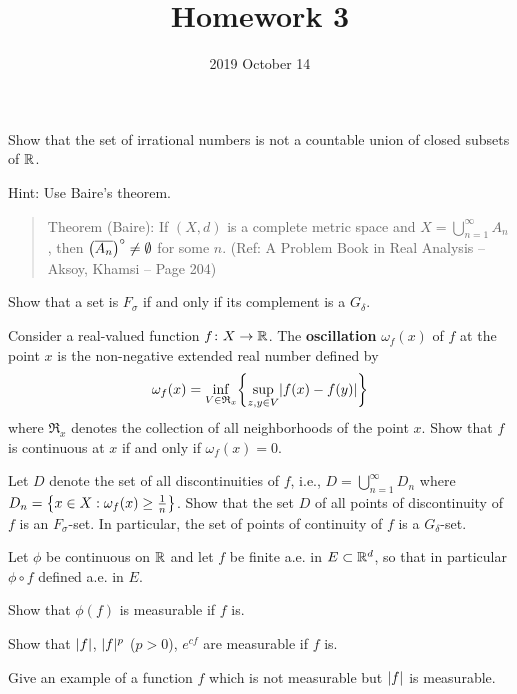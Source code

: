 \documentclass{../homework}
\title{Homework 3}
\author{}
\date{2019 October 14}
\begin{document}
\begin{problems}
\item Show that the set of irrational numbers is not a countable union
  of closed subsets of \(\RR\).

  Hint: Use Baire's theorem.
  \begin{quote}
    Theorem (Baire): If \((X, d)\) is a complete metric space and
    \(X = \bigcup_{n=1}^\infty A_n\), then
    \(\prn*{\overline{A_n}}^\circ \ne \emptyset\) for some \(n\).
    (Ref: A Problem Book in Real Analysis -- Aksoy, Khamsi -- Page
    204)
  \end{quote}

  \begin{solution}
  \end{solution}

\item
  \begin{problems}
  \item Show that a set is \(F_\sigma\) if and only if its complement
    is a \(G_\delta\).
  \item Consider a real-valued function \(f \colon X \to \RR\).  The
    \textbf{oscillation} \(\omega_f(x)\) of \(f\) at the point \(x\)
    is the non-negative extended real number defined by
    \[
      \omega_f(x) = \inf_{V \in \mathfrak R_x}
      \set*{\sup_{z, y \in V} \abs{f(x) - f(y)}}
    \]
    where \(\mathfrak R_x\) denotes the collection of all
    neighborhoods of the point \(x\).  Show that \(f\) is continuous
    at \(x\) if and only if \(\omega_f(x) = 0\).

  \item Let \(D\) denote the set of all discontinuities of \(f\),
    i.e., \(D = \bigcup_{n=1}^\infty D_n\) where
    \(D_n = \set*{x \in X : \omega_f(x) \ge \frac 1 n}\).  Show that
    the set \(D\) of all points of discontinuity of \(f\) is an
    \(F_\sigma\)-set.  In particular, the set of points of continuity
    of \(f\) is a \(G_\delta\)-set.
  \end{problems}

  \begin{solution}
    \begin{problems}
    \item
    \item
    \item
    \end{problems}
  \end{solution}

\item Let \(\phi\) be continuous on \(\RR\) and let \(f\) be finite
  a.e. in \(E \subset \RR^d\), so that in particular \(\phi \circ f\)
  defined a.e. in \(E\).
  \begin{problems}
  \item Show that \(\phi(f)\) is measurable if \(f\) is.
  \item Show that \(\abs f\), \(\abs f^p\) (\(p > 0\)), \(e^{cf}\) are
    measurable if \(f\) is.
  \item Give an example of a function \(f\) which is not measurable
    but \(\abs f\) is measurable.
  \end{problems}


\end{problems}
\end{document}
